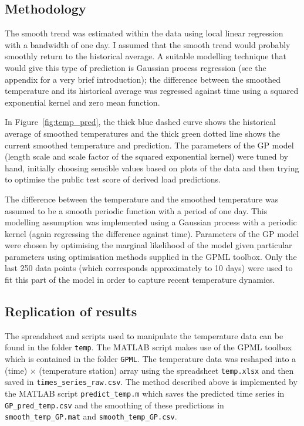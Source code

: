 \documentclass[preprint,authoryear,12pt]{elsarticle}
\begin{document}
\subsection{Methodology}

The smooth trend was estimated within the data using local linear regression \citep[e.g. chapter 6 of][]{Hastie2009} with a bandwidth of one day.
I assumed that the smooth trend would probably smoothly return to the historical average.
A suitable modelling technique that would give this type of prediction is Gaussian process regression \citep[e.g.][]{Rasmussen2006} (see the appendix for a very brief introduction); the difference between the smoothed temperature and its historical average was regressed against time using a squared exponential kernel and zero mean function.

In Figure~\ref{fig:temp_pred}, the thick blue dashed curve shows the historical average of smoothed temperatures and the thick green dotted line shows the current smoothed temperature and prediction.
The parameters of the GP model (length scale and scale factor of the squared exponential kernel) were tuned by hand, initially choosing sensible values based on plots of the data and then trying to optimise the public test score of derived load predictions.

The difference between the temperature and the smoothed temperature was assumed to be a smooth periodic function with a period of one day.
This modelling assumption was implemented using a Gaussian process with a periodic kernel (again regressing the difference against time).
Parameters of the GP model were chosen by optimising the marginal likelihood of the model given particular parameters using optimisation methods supplied in the GPML toolbox\footnotemark.
Only the last 250 data points (which corresponds approximately to 10 days) were used to fit this part of the model in order to capture recent temperature dynamics.

\subsection{Replication of results}

The spreadsheet and scripts used to manipulate the temperature data can be found in the folder \texttt{temp}.
The MATLAB script makes use of the GPML toolbox which is contained in the folder \texttt{GPML}.
The temperature data was reshaped into a (time) $\times$ (temperature station) array using the spreadsheet \texttt{temp.xlsx} and then saved in \texttt{times\_series\_raw.csv}.
The method described above is implemented by the MATLAB script \texttt{predict\_temp.m} which saves the predicted time series in \texttt{GP\_pred\_temp.csv} and the smoothing of these predictions in \texttt{smooth\_temp\_GP.mat} and \texttt{smooth\_temp\_GP.csv}.
\end{document}
